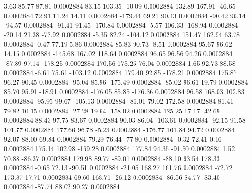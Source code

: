         3.63       85.77       87.81     0.0002884
       83.15      103.35      -10.09     0.0002884
      132.89      167.91      -46.65     0.0002884
       72.91       11.24       14.11     0.0002884
     -179.44       69.21       90.43     0.0002884
      -90.42       96.14      -94.57     0.0002884
      -91.41       91.45     -170.84     0.0002884
       -5.57      106.33     -168.94     0.0002884
      -20.14       21.38      -73.92     0.0002884
       -5.35       82.24     -104.12     0.0002884
      151.47      162.94       63.78     0.0002884
       -0.47       77.19        5.86     0.0002884
       85.83       90.73       -8.51     0.0002884
       95.67       96.62       14.15     0.0002884
     -145.68      167.02      118.64     0.0002884
       96.65       96.56       94.26     0.0002884
      -87.89       97.14     -178.25     0.0002884
      170.56      175.25       76.04     0.0002884
        1.65       92.73       88.58     0.0002884
       -6.61       75.61     -103.12     0.0002884
      179.40       92.85     -178.21     0.0002884
      175.87       96.27       90.45     0.0002884
      -95.04       85.96     -175.49     0.0002884
      -85.02       96.61       19.79     0.0002884
       85.70       95.91      -18.91     0.0002884
     -176.05       85.85     -176.36     0.0002884
       96.58      168.03      102.83     0.0002884
      -95.95       99.67     -105.13     0.0002884
      -86.01       79.02      172.58     0.0002884
       81.41       79.82       10.15     0.0002884
      -27.28       19.64     -158.02     0.0002884
      125.25       17.17      -42.69     0.0002884
       88.43       97.75       83.67     0.0002884
       90.03       86.04     -103.61     0.0002884
      -92.15       91.58      101.77     0.0002884
      177.66       96.78       -5.23     0.0002884
     -176.77      161.84       94.72     0.0002884
       92.07       88.00       69.84     0.0002884
       79.29       76.44      -77.80     0.0002884
       -0.32       72.41        0.16     0.0002884
      175.14      102.98     -169.28     0.0002884
      177.84       94.35      -91.50     0.0002884
        1.52       70.88      -86.37     0.0002884
      179.98       89.77      -89.01     0.0002884
      -88.10       93.54      178.33     0.0002884
       -0.65       72.13      -90.51     0.0002884
      -21.05      168.27      161.76     0.0002884
      -72.72      173.87       17.71     0.0002884
       69.60      168.71      -26.12     0.0002884
      -86.56       84.77      -83.40     0.0002884
      -87.74       88.02       90.27     0.0002884
